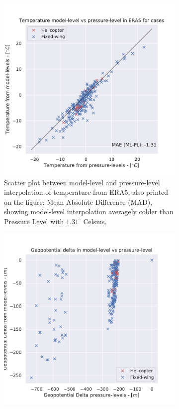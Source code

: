 \begin{figure}
    \centering
    \begin{subfigure}[h]{0.45\textwidth}
    \includegraphics[width=\textwidth]{Figures/mlvspl.pdf}
    \caption{Scatter plot between model-level and pressure-level interpolation of temperature from ERA5, also printed on the figure: Mean Absolute Difference (MAD), showing model-level interpolation averagely colder than Pressure Level with $1.31^{\circ}$ Celsius.}
    \label{fig:mlvspltemp}
    \end{subfigure}
    \hfill
    \begin{subfigure}[h]{0.45\textwidth}
    \includegraphics[width=\textwidth]{Figures/geopot.pdf}

\end{subfigure}
\end{figure}
